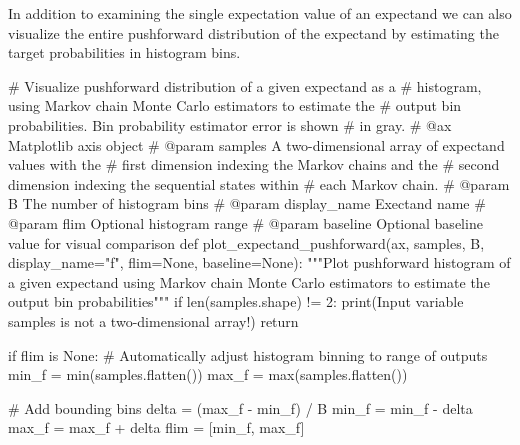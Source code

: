 \documentclass[
  letterpaper,
  DIV=11,
  numbers=noendperiod]{scrartcl}
\newenvironment{Shaded}{\begin{snugshade}}{\end{snugshade}}
\newcommand{\BuiltInTok}[1]{\textcolor[rgb]{0.00,0.23,0.31}{#1}}
\newcommand{\CommentTok}[1]{\textcolor[rgb]{0.37,0.37,0.37}{#1}}
\newcommand{\ControlFlowTok}[1]{\textcolor[rgb]{0.00,0.23,0.31}{#1}}
\newcommand{\DecValTok}[1]{\textcolor[rgb]{0.68,0.00,0.00}{#1}}
\newcommand{\KeywordTok}[1]{\textcolor[rgb]{0.00,0.23,0.31}{#1}}
\newcommand{\NormalTok}[1]{\textcolor[rgb]{0.00,0.23,0.31}{#1}}
\newcommand{\OperatorTok}[1]{\textcolor[rgb]{0.37,0.37,0.37}{#1}}
\newcommand{\StringTok}[1]{\textcolor[rgb]{0.13,0.47,0.30}{#1}}
\newcommand{\VariableTok}[1]{\textcolor[rgb]{0.07,0.07,0.07}{#1}}
\begin{document}
In addition to examining the single expectation value of an expectand we
can also visualize the entire pushforward distribution of the expectand
by estimating the target probabilities in histogram bins.

\begin{Shaded}
\begin{Highlighting}[]
\CommentTok{\# Visualize pushforward distribution of a given expectand as a }
\CommentTok{\# histogram, using Markov chain Monte Carlo estimators to estimate the }
\CommentTok{\# output bin probabilities.  Bin probability estimator error is shown }
\CommentTok{\# in gray.}
\CommentTok{\# @ax Matplotlib axis object}
\CommentTok{\# @param samples A two{-}dimensional array of expectand values with the }
\CommentTok{\#                first dimension indexing the Markov chains and the }
\CommentTok{\#                second dimension indexing the sequential states within }
\CommentTok{\#                each Markov chain.}
\CommentTok{\# @param B The number of histogram bins}
\CommentTok{\# @param display\_name Exectand name}
\CommentTok{\# @param flim Optional histogram range}
\CommentTok{\# @param baseline Optional baseline value for visual comparison}
\KeywordTok{def}\NormalTok{ plot\_expectand\_pushforward(ax, samples, B, display\_name}\OperatorTok{=}\StringTok{"f"}\NormalTok{, }
\NormalTok{                               flim}\OperatorTok{=}\VariableTok{None}\NormalTok{, baseline}\OperatorTok{=}\VariableTok{None}\NormalTok{):}
  \CommentTok{"""Plot pushforward histogram of a given expectand using Markov chain}
\CommentTok{     Monte Carlo estimators to estimate the output bin probabilities"""}
  \ControlFlowTok{if} \BuiltInTok{len}\NormalTok{(samples.shape) }\OperatorTok{!=} \DecValTok{2}\NormalTok{:}
    \BuiltInTok{print}\NormalTok{(}\StringTok{\textquotesingle{}Input variable \textasciigrave{}samples\textasciigrave{} is not a two{-}dimensional array!\textquotesingle{}}\NormalTok{)}
    \ControlFlowTok{return}
    
  \ControlFlowTok{if}\NormalTok{ flim }\KeywordTok{is} \VariableTok{None}\NormalTok{:}
    \CommentTok{\# Automatically adjust histogram binning to range of outputs}
\NormalTok{    min\_f }\OperatorTok{=} \BuiltInTok{min}\NormalTok{(samples.flatten())}
\NormalTok{    max\_f }\OperatorTok{=} \BuiltInTok{max}\NormalTok{(samples.flatten())}
    
    \CommentTok{\# Add bounding bins}
\NormalTok{    delta }\OperatorTok{=}\NormalTok{ (max\_f }\OperatorTok{{-}}\NormalTok{ min\_f) }\OperatorTok{/}\NormalTok{ B}
\NormalTok{    min\_f }\OperatorTok{=}\NormalTok{ min\_f }\OperatorTok{{-}}\NormalTok{ delta}
\NormalTok{    max\_f }\OperatorTok{=}\NormalTok{ max\_f }\OperatorTok{+}\NormalTok{ delta}
\NormalTok{    flim }\OperatorTok{=}\NormalTok{ [min\_f, max\_f]}
    

\end{Highlighting}
\end{Shaded}
\end{document}

